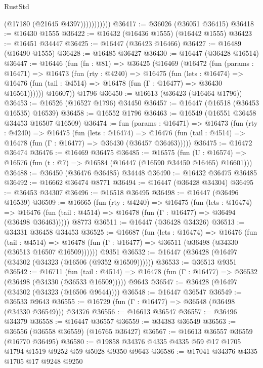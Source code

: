 \begin{lexlean}{RustStd}
\begin{coremodule}
{\begin{coremodule}
{{{{{{{{{{{{{{{{{{{{{{{{{{{{{{{{{{{{{{{{{{{{{{{{{{{{{{{                      (@17180 (@21645 @4397)))))))))))
@36417 := @36026 (@36051 @36415)
@36418 := @16430 @1555
@36422 := @16432 (@16436 @1555) (@16442 @1555)
@36423 := @16451 @34447
@36425 := @16447 (@36423 @16466)
@36427 := @16489 (@16490 @1555)
@36428 := @16485 @36427
@36430 := @16447 (@36428 @16514)
@36447 := @16446
    (fun (fn : @81) =>
    @36425
      (@16469
        (@16472
          (fun (params : @16471) =>
          @16473
            (fun (rty : @4240) =>
            @16475
              (fun (lets : @16474) =>
              @16476 (fun (tail : @4514) => @16478 (fun (Γ : @16477) => @36430 @16561))))))
        @16607))
    @1796
@36450 := @16613 (@36423 (@16464 @1796))
@36453 := @16526 (@16527 @1796) @34450
@36457 := @16447 (@16518 (@36453 @16535) @16539)
@36458 := @16552 @1796
@36463 := @16549 (@16551 @36458 @34453 @16507 @16509)
@36474 := fun (params : @16471) =>
  @16473
    (fun (rty : @4240) =>
    @16475
      (fun (lets : @16474) =>
      @16476 (fun (tail : @4514) => @16478 (fun (Γ : @16477) => @36430 (@36457 @36463)))))
@36475 := @16472 @36474
@36476 := @16469 @36475
@36485 := @16575
    (fun (U : @16574) => @16576 (fun (t : @7) => @16584 (@16447 (@16590 @34450 @16465) @16601)))
@36488 := @36450 (@36476 @36485) @34448
@36490 := @16432 @36475 @36485
@36492 := @16662 @36474 @8771
@36494 := @16447 (@36428 @34304)
@36495 := @36453 @34307
@36496 := @16518 @36495
@36498 := @16447 (@36496 @16539)
@36509 := @16665
    (fun (rty : @4240) =>
    @16475
      (fun (lets : @16474) =>
      @16476 (fun (tail : @4514) => @16478 (fun (Γ : @16477) => @36494 (@36498 @36463)))))
    @8773
@36511 := @16447 (@36428 @34326)
@36513 := @34331 @36458 @34453
@36525 := @16687
    (fun (lets : @16474) =>
    @16476
      (fun (tail : @4514) =>
      @16478 (fun (Γ : @16477) => @36511 (@36498 (@34330 (@36513 @16507 @16509))))))
    @9351
@36532 := @16447 (@36428 (@16497 (@34302 (@34323 (@16506 (@9352 @16509))))))
@36533 := @36513 @9351
@36542 := @16711
    (fun (tail : @4514) => @16478 (fun (Γ : @16477) => @36532 (@36498 (@34330 (@36533 @16509)))))
    @9643
@36547 := @36428 (@16497 (@34302 (@34323 (@16506 @9644))))
@36548 := @16447 @36547
@36549 := @36533 @9643
@36555 := @16729 (fun (Γ : @16477) => @36548 (@36498 (@34330 @36549))) @34376
@36556 := @16613 @36547
@36557 := @36496 @34379
@36558 := @16447 @36557
@36559 := @34383 @36549
@36563 := @36556 (@36558 @36559) (@16765 @36427)
@36567 := @16613 @36557 @36559 (@16770 @36495)
@36580 := @19858 @34376 @4335 @4335 @59 @17 @1705 @1794 @1519 @9252 @59 @5028 @9350 @9643
@36586 := @17041 @34376 @4335 @1705 @17 @9248 @9250
}}}}}}}}}}}}}}}}}}}}}}}}}}}}}}}}}}}}}}}}}}}}}}}}}}}}}}}
\end{coremodule}}
\end{coremodule}
\end{lexlean}
